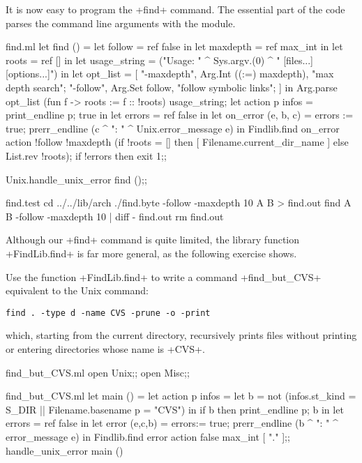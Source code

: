 It is now easy to program the \ml+find+ command. The essential part of
the code parses the command line arguments with the 
module.
\begin{listingcodefile}{find.ml}
let find () =
  let follow = ref false in
  let maxdepth = ref max_int in
  let roots = ref [] in
  let usage_string  =
    ("Usage: " ^ Sys.argv.(0) ^ " [files...] [options...]") in
  let opt_list =  [ 
    "-maxdepth", Arg.Int ((:=) maxdepth), "max depth search";
    "-follow", Arg.Set follow, "follow symbolic links";
  ] in
  Arg.parse opt_list (fun f -> roots := f :: !roots) usage_string;
  let action p infos = print_endline p; true in
  let errors = ref false in
  let on_error (e, b, c) =
    errors := true; prerr_endline (c ^ ": " ^ Unix.error_message e) in
  Findlib.find on_error action !follow !maxdepth 
    (if !roots = [] then [ Filename.current_dir_name ] 
     else List.rev !roots);
  if !errors then exit 1;; 

Unix.handle_unix_error find ();;
\end{listingcodefile}
%
\begin{codefile}{find.test}
cd ../../lib/arch
./find.byte -follow -maxdepth 10 A B > find.out
find A B -follow -maxdepth 10 | diff - find.out
rm find.out
\end{codefile}
Although our \ml+find+ command is quite limited, the library
function \ml+FindLib.find+ is far more general, as the following
exercise shows.
\begin{exercise}
Use the function \ml+FindLib.find+ to write a command
\ml+find_but_CVS+ equivalent to the Unix command:
\begin{lstlisting}
find . -type d -name CVS -prune -o -print
\end{lstlisting}
which, starting from the current directory, recursively prints
files without printing or entering directories whose name is \ml+CVS+.
\end{exercise}
\begin{answer}
\begin{codefile}{find_but_CVS.ml}
open Unix;;
open Misc;;
\end{codefile}
%
\begin{listingcodefile}{find_but_CVS.ml}
let main () = 
  let action p infos = 
    let b = not (infos.st_kind = S_DIR || Filename.basename p = "CVS") in
    if b then print_endline p; b in
  let errors = ref false in
  let error (e,c,b) = 
    errors:= true; prerr_endline (b ^ ": " ^ error_message e) in
  Findlib.find error action false max_int [ "." ];;
handle_unix_error main ()
\end{listingcodefile}
\end{answer}

